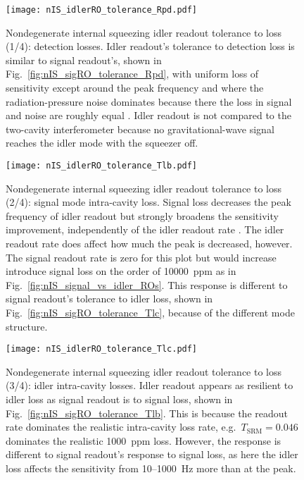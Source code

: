 \begin{figure}
    \centering
    \texttt{[image: nIS\_idlerRO\_tolerance\_Rpd.pdf]} 
    \caption{  Nondegenerate internal squeezing idler readout tolerance to loss (1/4): detection losses. Idler readout's tolerance to detection loss is similar to signal readout's, shown in Fig.~\ref{fig:nIS_sigRO_tolerance_Rpd}, with uniform loss of sensitivity except around the peak frequency and where the radiation-pressure noise dominates because there the loss in signal and noise are roughly equal . Idler readout is not compared to the two-cavity interferometer because no gravitational-wave signal reaches the idler mode with the squeezer off.}
    \label{fig:nIS_idlerRO_tolerance_Rpd}
\end{figure}
\begin{figure}
	\centering
	\texttt{[image: nIS\_idlerRO\_tolerance\_Tlb.pdf]}
	\caption{  Nondegenerate internal squeezing idler readout tolerance to loss (2/4): signal mode intra-cavity loss. Signal loss decreases the peak frequency of idler readout but strongly broadens the sensitivity improvement, independently of the idler readout rate . The idler readout rate does affect how much the peak is decreased, however. The signal readout rate is zero for this plot but would increase introduce signal loss on the order of 10000~ppm as in Fig.~\ref{fig:nIS_signal_vs_idler_ROs}. This response is different to signal readout's tolerance to idler loss, shown in Fig.~\ref{fig:nIS_sigRO_tolerance_Tlc}, because of the different mode structure.}
	\label{fig:nIS_idlerRO_tolerance_Tlb}
\end{figure}
\begin{figure}
	\centering
	\texttt{[image: nIS\_idlerRO\_tolerance\_Tlc.pdf]}
	\caption{  Nondegenerate internal squeezing idler readout tolerance to loss (3/4): idler intra-cavity losses. Idler readout appears as resilient to idler loss as signal readout is to signal loss, shown in Fig.~\ref{fig:nIS_sigRO_tolerance_Tlb}. This is because the readout rate dominates the realistic intra-cavity loss rate, e.g.\ $T_\text{SRM}=0.046$ dominates the realistic 1000~ppm loss. However, the response is different to signal readout's response to signal loss, as here the idler loss affects the sensitivity from 10--1000~Hz more than at the peak. }
	\label{fig:nIS_idlerRO_tolerance_Tlc}
\end{figure}
